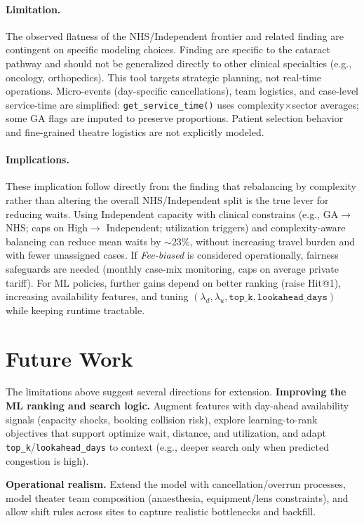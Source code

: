 \documentclass[ %
                    author={Nattanan Nawakitbamrung},
                supervisor={Dr. Sébastien Rochat},
                    degree={MSc},
                     title={Developing and Evaluating the Impact of a Single Patient Treatment List (PTL) for an NHS Integrated Care System},
                  subtitle={},
                      type={},
                      year={2025}]{dissertation}
\begin{document}
\paragraph{Limitation.} 
The observed flatness of the NHS/Independent frontier and related finding are contingent on specific modeling choices. Finding are specific to the cataract pathway and should not be generalized directly to other clinical specialties (e.g., oncology, orthopedics). This tool targets strategic planning, not real-time operations. Micro-events (day-specific cancellations), team logistics, and case-level service-time are simplified: \texttt{get\_service\_time()} uses complexity$\times$sector averages; some GA flags are imputed to preserve proportions. Patient selection behavior and fine-grained theatre logistics are not explicitly modeled.

\paragraph{Implications.}
These implication follow directly from the finding that rebalancing by complexity rather than altering the overall NHS/Independent split is the true lever for reducing waits. Using Independent capacity with clinical constrains (e.g., GA$\rightarrow$NHS; caps on High$\rightarrow$ Independent; utilization triggers) and complexity-aware balancing can reduce mean waits by $\sim$23\%, without increasing travel burden and with fewer unassigned cases. If \textit{Fee-biased} is considered operationally, fairness safeguards are needed (monthly case-mix monitoring, caps on average private tariff). For ML policies, further gains depend on better ranking (raise Hit@1), increasing availability features, and tuning $(\lambda_d,\lambda_u,\texttt{top\_k},\texttt{lookahead\_days})$ while keeping runtime tractable.

\section{Future Work}
The limitations above suggest several directions for extension.
\textbf{Improving the ML ranking and search logic.} Augment features with day-ahead availability signals (capacity shocks, booking collision risk), explore learning-to-rank objectives that support optimize wait, distance, and utilization, and adapt \texttt{top\_k}/\texttt{lookahead\_days} to context (e.g., deeper search only when predicted congestion is high).

\textbf{Operational realism.} Extend the model with cancellation/overrun processes, model theater team composition (anaesthesia, equipment/lens constraints), and allow shift rules across sites to capture realistic bottlenecks and backfill.
\end{document}
